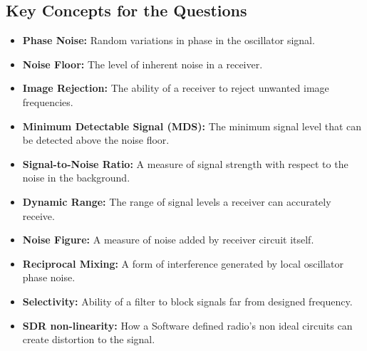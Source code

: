 
\subsection*{Key Concepts for the Questions}
\begin{itemize}
    \item \textbf{Phase Noise:} Random variations in phase in the oscillator signal.
     \item \textbf{Noise Floor:}  The level of inherent noise in a receiver.
     \item  \textbf{Image Rejection:} The ability of a receiver to reject unwanted image frequencies.
     \item  \textbf{Minimum Detectable Signal (MDS):} The minimum signal level that can be detected above the noise floor.
        \item \textbf{Signal-to-Noise Ratio:} A measure of signal strength with respect to the noise in the background.
        \item  \textbf{Dynamic Range:} The range of signal levels a receiver can accurately receive.
    \item \textbf{Noise Figure:} A measure of noise added by receiver circuit itself.
    \item \textbf{Reciprocal Mixing:} A form of interference generated by local oscillator phase noise.
    \item \textbf{Selectivity:} Ability of a filter to block signals far from designed frequency.
     \item \textbf{SDR non-linearity:} How a Software defined radio's non ideal circuits can create distortion to the signal.
    
\end{itemize}

